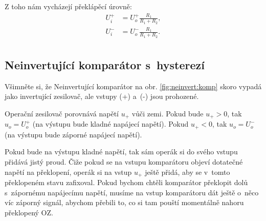 \documentclass[a4paper,12pt]{article}   %
\begin{document}
Z toho nám vycházejí překlápěcí úrovně:\\
\begin{align*}
    U_i^+ &= U_o^+\frac{R_1}{R_1 + R_2},\\
    U_i^- &= U_o^-\frac{R_1}{R_1 + R_2}.\\
\end{align*}





\subsection*{Neinvertující komparátor s~hysterezí}
Všimněte si, že Neinvertující komparátor na obr. \ref{fig:neinvert:komp} skoro vypadá jako invertující zesilovač, ale vstupy (+) a~(-) jsou prohozené.

Operační zesilovač porovnává napětí $u_+$ vůči zemi. Pokud bude $u_+ > 0$, tak $u_o = U_o^+$ (na výstupu bude kladné napájecí napětí). Pokud $u_+ < 0$, tak $u_o = U_o^-$ (na výstupu bude záporné napájecí napětí).

Pokud bude na výstupu kladné napětí, tak sám operák si do svého vstupu přidává jistý proud. Čiže pokud se na vstupu komparátoru objeví dotatečné napětí na překlopení, operák si na vstup $u_+$ ještě přidá, aby se v~tomto překlopeném stavu zafixoval. Pokud bychom chtěli komparátor překlopit dolů s~zápornému napájecímu napětí, musíme na vstup komparátoru dát ještě o~něco víc záporný signál, abychom přebili to, co si tam pouští momentálně nahoru překlopený OZ.
\end{document}
